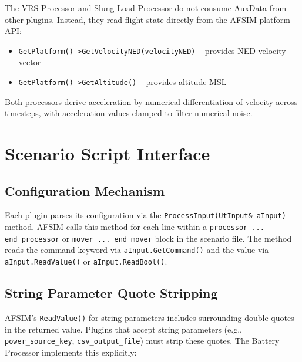 \unclass The VRS Processor and Slung Load Processor do not consume AuxData from other plugins. Instead, they read flight state directly from the AFSIM platform API:

\begin{itemize}
    \item \unclass \texttt{GetPlatform()->GetVelocityNED(velocityNED)} -- provides NED velocity vector
    \item \unclass \texttt{GetPlatform()->GetAltitude()} -- provides altitude MSL
\end{itemize}

\unclass Both processors derive acceleration by numerical differentiation of velocity across timesteps, with acceleration values clamped to filter numerical noise.

\pagebreak


\section{\unclass Scenario Script Interface}

\subsection{\unclass Configuration Mechanism}

\unclass Each plugin parses its configuration via the \texttt{ProcessInput(UtInput\& aInput)} method. AFSIM calls this method for each line within a \texttt{processor ... end\_processor} or \texttt{mover ... end\_mover} block in the scenario file. The method reads the command keyword via \texttt{aInput.GetCommand()} and the value via \texttt{aInput.ReadValue()} or \texttt{aInput.ReadBool()}.

\subsection{\unclass String Parameter Quote Stripping}

\unclass AFSIM's \texttt{ReadValue()} for string parameters includes surrounding double quotes in the returned value. Plugins that accept string parameters (e.g., \texttt{power\_source\_key}, \texttt{csv\_output\_file}) must strip these quotes. The Battery Processor implements this explicitly:

